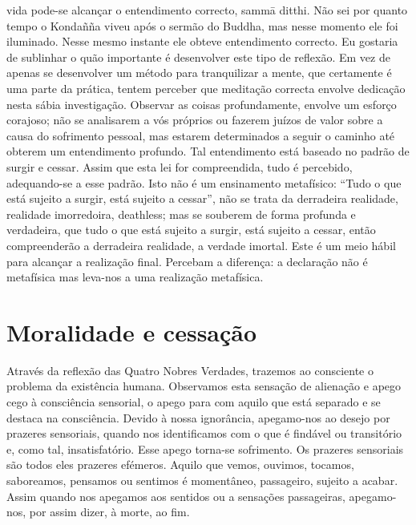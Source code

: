 vida pode-se alcançar o entendimento correcto, sammā ditthi.
Não sei por quanto tempo o Kondañña viveu após o sermão
do Buddha, mas nesse momento ele foi iluminado. Nesse
mesmo instante ele obteve entendimento correcto.
Eu gostaria de sublinhar o quão importante é desenvolver
este tipo de reflexão. Em vez de apenas se desenvolver um
método para tranquilizar a mente, que certamente é uma parte
da prática, tentem perceber que meditação correcta envolve
dedicação nesta sábia investigação. Observar as coisas profundamente,
envolve um esforço corajoso; não se analisarem
a vós próprios ou fazerem juízos de valor sobre a causa do
sofrimento pessoal, mas estarem determinados a seguir o
caminho até obterem um entendimento profundo. Tal
entendimento está baseado no padrão de surgir e cessar.
Assim que esta lei for compreendida, tudo é percebido, adequando-se a esse padrão.
Isto não é um ensinamento metafísico: “Tudo o que está
sujeito a surgir, está sujeito a cessar”, não se trata da derradeira realidade, realidade imorredoira, deathless; mas se souberem de forma profunda e verdadeira, que tudo o que está
sujeito a surgir, está sujeito a cessar, então compreenderão a
derradeira realidade, a verdade imortal. Este é um meio hábil
para alcançar a realização final. Percebam a diferença: a
declaração não é metafísica mas leva-nos a uma realização
metafísica.

\section{Moralidade e cessação}

Através da reflexão das Quatro Nobres Verdades, trazemos
ao consciente o problema da existência humana. Observamos
esta sensação de alienação e apego cego à consciência sensorial, o apego para com aquilo que está separado e se destaca
na consciência. Devido à nossa ignorância, apegamo-nos ao
desejo por prazeres sensoriais, quando nos identificamos com
o que é findável ou transitório e, como tal, insatisfatório. Esse
apego torna-se sofrimento.
Os prazeres sensoriais são todos eles prazeres efémeros.
Aquilo que vemos, ouvimos, tocamos, saboreamos, pensamos
ou sentimos é momentâneo, passageiro, sujeito a acabar.
Assim quando nos apegamos aos sentidos ou a sensações
passageiras, apegamo-nos, por assim dizer, à morte, ao fim.

